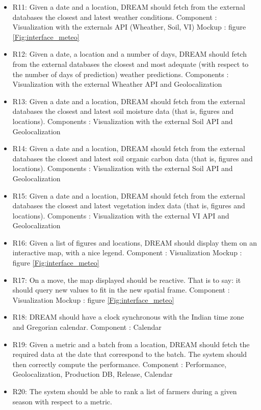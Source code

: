 \begin{itemize}
	\item
	R11: Given a date and a location, DREAM should fetch from the external databases the  closest and latest weather conditions.
	\subitem Component : Visualization with the externals API (Wheather, Soil, VI)
	\subitem Mockup : figure \ref{Fig:interface_meteo}
	\item
	R12: Given a date, a location and a number of days, DREAM should fetch from the external databases the  closest and most adequate (with respect to the number of days of prediction) weather predictions.
	\subitem Components : Visualization with the external Wheather API and Geolocalization
	\item
	R13: Given a date and a location, DREAM should fetch from the external databases the  closest and latest soil moisture data (that is, figures and locations).
	\subitem Components : Visualization with the external Soil API and Geolocalization
	\item
	R14: Given a date and a location, DREAM should fetch from the external databases the  closest and latest soil organic carbon data (that is, figures and locations).
	\subitem Components : Visualization with the external Soil API and Geolocalization
	\item
	R15: Given a date and a location, DREAM should fetch from the external databases the  closest and latest vegetation index data (that is, figures and locations).
	\subitem Components : Visualization with the external VI API and Geolocalization
	\item
	R16: Given a list of figures and locations, DREAM should display them on an interactive map, with a nice legend.
	\subitem Component : Visualization
	\subitem Mockup : figure \ref{Fig:interface_meteo}
	\item
	R17: On a move, the map displayed should be reactive. That is to say: it should query new values to fit in the new spatial frame.
	\subitem Component : Visualization
	\subitem Mockup : figure \ref{Fig:interface_meteo}
	\item
	R18: DREAM should have a clock synchronous with the Indian time zone and Gregorian calendar.
	\subitem Component : Calendar
	\item
	R19: Given a metric and a batch from a location, DREAM should fetch the required data at the date that correspond to the batch. The system should then correctly compute the performance.
	\subitem Component : Performance, Geolocalization, Production DB, Release, Calendar
	\item
	R20: The system should be able to rank a list of farmers during a given season with respect to a metric.

\end{itemize}
